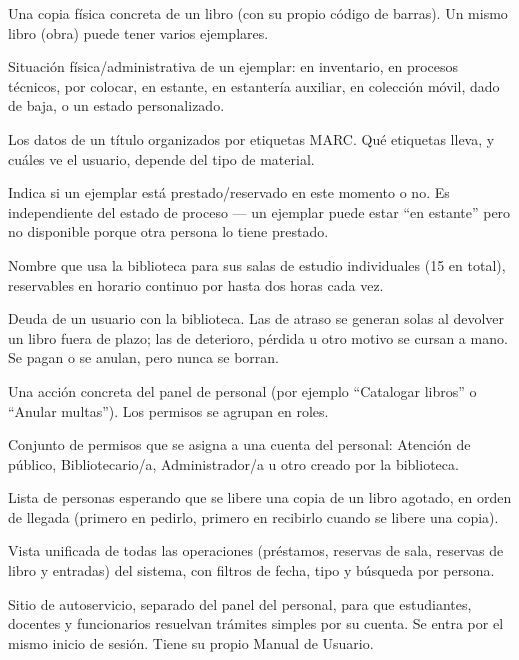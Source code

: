 \documentclass[11pt,a4paper]{report}
\begin{document}
\begin{description}[leftmargin=0pt,style=nextline]
  \item[Ejemplar] Una copia física concreta de un libro (con su propio
  código de barras). Un mismo libro (obra) puede tener varios ejemplares.

  \item[Estado de proceso] Situación física/administrativa de un
  ejemplar: en inventario, en procesos técnicos, por colocar, en
  estante, en estantería auxiliar, en colección móvil, dado de baja, o
  un estado personalizado.

  \item[Ficha bibliográfica] Los datos de un título organizados por
  etiquetas MARC. Qué etiquetas lleva, y cuáles ve el usuario, depende del
  tipo de material.

  \item[Disponible] Indica si un ejemplar está prestado/reservado en
  este momento o no. Es independiente del estado de proceso --- un
  ejemplar puede estar ``en estante'' pero no disponible porque otra
  persona lo tiene prestado.

  \item[Logia] Nombre que usa la biblioteca para sus salas de estudio
  individuales (15 en total), reservables en horario continuo por hasta
  dos horas cada vez.

  \item[Multa] Deuda de un usuario con la biblioteca. Las de atraso se
  generan solas al devolver un libro fuera de plazo; las de deterioro,
  pérdida u otro motivo se cursan a mano. Se pagan o se anulan, pero
  nunca se borran.

  \item[Permiso] Una acción concreta del panel de personal (por ejemplo
  ``Catalogar libros'' o ``Anular multas''). Los permisos se agrupan en
  roles.

  \item[Rol] Conjunto de permisos que se asigna a una cuenta del
  personal: Atención de público, Bibliotecario/a, Administrador/a u otro
  creado por la biblioteca.

  \item[Cola de espera] Lista de personas esperando que se libere una
  copia de un libro agotado, en orden de llegada (primero en pedirlo,
  primero en recibirlo cuando se libere una copia).

  \item[Registro Absoluto] Vista unificada de todas las operaciones
  (préstamos, reservas de sala, reservas de libro y entradas) del
  sistema, con filtros de fecha, tipo y búsqueda por persona.

  \item[Portal de la biblioteca] Sitio de autoservicio, separado del panel
  del personal, para que estudiantes, docentes y funcionarios resuelvan
  trámites simples por su cuenta. Se entra por el mismo inicio de sesión.
  Tiene su propio Manual de Usuario.
\end{description}
\end{document}
